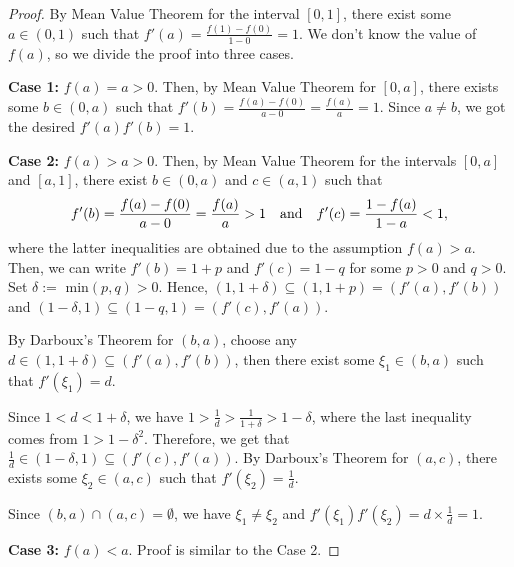 \documentclass[11pt]{article}
\theoremstyle{plain}
\theoremstyle{remark}
\begin{document}
\begin{proof}
	By Mean Value Theorem for the interval $[0,1]$, there exist some $a \in (0,1)$ such that 
	$f'(a) = \frac{f(1)-f(0)}{1-0}=1$. We don't know the value of $f(a)$, so we divide the proof into three cases.
	
	{\bf Case 1:} $f(a)=a>0$. Then, by Mean Value Theorem for $[0,a]$, there exists some $b \in (0,a)$ such that $f'(b) = \frac{f(a)-f(0)}{a-0}=\frac{f(a)}{a} = 1$. Since $a \neq b$, we got the desired $f'(a)f'(b) =1$.
	
	{\bf Case 2:} $f(a)>a>0$. Then, by Mean Value Theorem for the intervals 
	$[0, a]$ and $[a,1]$, there exist $b \in (0,a)$ and $c \in (a,1)$ such that 
	$$
	f'(b) =\frac{f(a)-f(0)}{a-0}=\frac{f(a)}{a}>1 \quad {\rm and} \quad
	f'(c) =\frac{1-f(a)}{1-a}<1,
	$$
	where the latter inequalities are obtained due to the assumption $f(a)>a$. Then, we can write $f'(b) = 1+p$ and $f'(c) = 1-q$ for some $p>0$ and $q>0$. Set $\delta:=$ min$(p,q)>0$. Hence, $(1,1+\delta) \subseteq (1, 1+p) = (f'(a), f'(b))$ and $(1-\delta,1) \subseteq (1-q, 1) = (f'(c), f'(a))$. 
	
	By Darboux's Theorem for $(b,a)$, choose any $d \in (1,1+\delta) \subseteq(f'(a), f'(b))$, then there exist some $\xi_1 \in (b,a)$ such that 
	$f'(\xi_1)=d$. 
	
	Since $1<d<1+\delta$, we have $1> \frac{1}{d} > \frac{1}{1+\delta} > 1-\delta$, where the last inequality comes from $1>1-\delta^2$. Therefore, we get that $\frac{1}{d} \in (1-\delta, 1) \subseteq (f'(c), f'(a))$. By Darboux's Theorem for $(a,c)$, there exists some $\xi_2 \in (a,c)$ such that 
	$f'(\xi_2) = \frac{1}{d}$. 
	
	Since $(b,a) \cap (a,c) = \emptyset$, we have $\xi_1 \neq \xi_2$ and  
	$
	f'(\xi_1)f'(\xi_2)= d \times \frac{1}{d} = 1.
	$
	
	{\bf Case 3:} $f(a)<a$. Proof is similar to the Case 2.
\end{proof}

	
\end{document}
